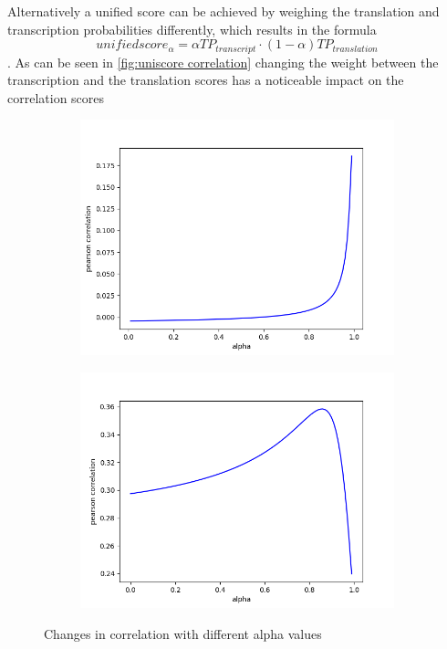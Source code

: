 Alternatively a unified score can be achieved by weighing the translation and transcription probabilities differently, which results in the formula $$unifiedscore_\alpha= \alpha TP_{transcript} \cdot (1-\alpha)TP_{translation}$$. 
As can be seen in \autoref{fig:uniscore correlation} changing the weight between the transcription and the translation scores has a noticeable impact on the correlation scores
\begin{figure}
    \centering
    \begin{subfigure}{0.4\linewidth}
        \includegraphics[width=\linewidth]{Latex/sections/images/dlmuniscoredistribution.png}
    \end{subfigure}
    \begin{subfigure}{0.4\linewidth}
        \includegraphics[width=\linewidth]{Latex/sections/images/seamlessuniscoredistribution.png}
    \end{subfigure}
    \caption{Changes in correlation with different alpha values}
    \label{fig:uniscore correlation}
\end{figure}

